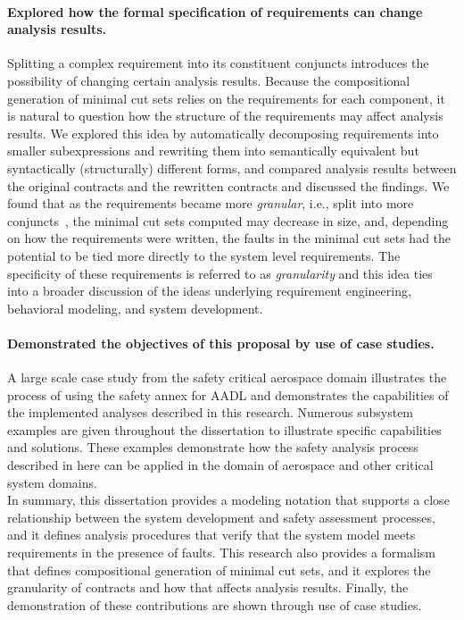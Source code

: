 \paragraph{Explored how the formal specification of requirements can change analysis results.}
Splitting a complex requirement into its constituent conjuncts introduces the possibility of changing certain analysis results. Because the compositional generation of minimal cut sets relies on the requirements for each component, it is natural to question how the structure of the requirements may affect analysis results. We explored this idea by automatically decomposing requirements into smaller subexpressions and rewriting them into semantically equivalent but syntactically (structurally) different forms, and compared analysis results between the original contracts and the rewritten contracts and discussed the findings. We found that as the requirements became more \emph{granular}, i.e., split into more conjuncts~\cite{ghassabani_2018}, the minimal cut sets computed may decrease in size, and, depending on how the requirements were written, the faults in the minimal cut sets had the potential to be tied more directly to the system level requirements. The specificity of these requirements is referred to as \emph{granularity} and this idea ties into a broader discussion of the ideas underlying requirement engineering, behavioral modeling, and system development. 

\paragraph{Demonstrated the objectives of this proposal by use of case studies.}
A large scale case study from the safety critical aerospace domain illustrates the process of using the safety annex for AADL and demonstrates the capabilities of the implemented analyses described in this research. Numerous subsystem examples are given throughout the dissertation to illustrate specific capabilities and solutions. These examples demonstrate how the safety analysis process described in here can be applied in the domain of aerospace and other critical system domains. \\

In summary, this dissertation provides a modeling notation that supports a close relationship between the system development and safety assessment processes, and it defines analysis procedures that verify that the system model meets requirements in the presence of faults. This research also provides a formalism that defines compositional generation of minimal cut sets, and it explores the granularity of contracts and how that affects analysis results. Finally, the demonstration of these contributions are shown through use of case studies. 

